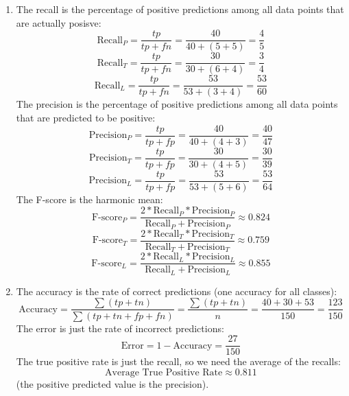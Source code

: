 \documentclass[12pt]{article}
\begin{document}
\begin{enumerate}[label = \letters]
    \item 
    The recall is the percentage of positive
    predictions among all data points that are actually
    posisve:
    \[ \text{Recall}_P = \dfrac{tp}{tp + fn} 
    = \dfrac{40}{40 + (5 + 5)}  = \dfrac{4}{5} \]
    \[ \text{Recall}_T = \dfrac{tp}{tp + fn} 
    = \dfrac{30}{30 + (6 + 4)}  = \dfrac{3}{4} \]
    \[ \text{Recall}_L = \dfrac{tp}{tp + fn} 
    = \dfrac{53}{53 + (3 + 4)}  = \dfrac{53}{60} \]
    The precision is the percentage of positive
    predictions among all data points that are
    predicted to be positive:
    \[ \text{Precision}_P = \dfrac{tp}{tp + fp} 
    = \dfrac{40}{40 + (4 + 3)}  = \dfrac{40}{47} \]
    \[ \text{Precision}_T = \dfrac{tp}{tp + fp} 
    = \dfrac{30}{30 + (4 + 5)}  = \dfrac{30}{39} \]
    \[ \text{Precision}_L = \dfrac{tp}{tp + fp} 
    = \dfrac{53}{53 + (5 + 6)}  = \dfrac{53}{64} \]
    The F-score is the harmonic mean:
    \[ \text{F-score}_P = 
    \dfrac{2 * \text{Recall}_P * \text{Precision}_P}
    {\text{Recall}_P + \text{Precision}_P} \approx
    0.824 \]
    \[ \text{F-score}_T = 
    \dfrac{2 * \text{Recall}_T * \text{Precision}_T}
    {\text{Recall}_T + \text{Precision}_T} \approx
    0.759 \]
    \[ \text{F-score}_L = 
    \dfrac{2 * \text{Recall}_L * \text{Precision}_L}
    {\text{Recall}_L + \text{Precision}_L} \approx
    0.855 \]
\item 
    The accuracy is the rate of correct
    predictions (one accuracy for all classes):
    \[ \text{Accuracy} = \dfrac{\sum (tp + tn)}
    {\sum (tp + tn + fp + fn)} = \dfrac{\sum (tp + tn)}{n}
    = \dfrac{40 + 30 + 53}{150} = \dfrac{123}{150} \]
    The error is just the rate of incorrect predictions:
    \[ \text{Error} = 1 - \text{Accuracy} = \dfrac{27}{150} \]
    The true positive rate is just the recall,
    so we need the average of the recalls:
    \[ \text{Average True Positive Rate}
    \approx 0.811 \]
    (the positive predicted value is the precision). \\

\end{enumerate}

\newpage
\end{document}
